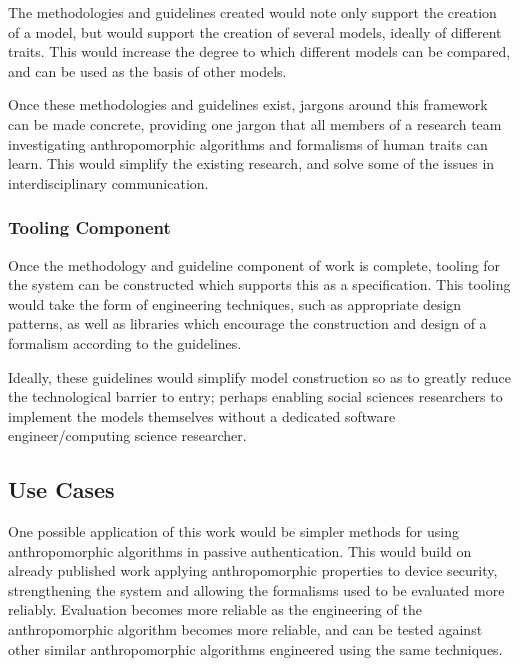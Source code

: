 The methodologies and guidelines created would note only support the creation of a model, but would support the creation of several models, ideally of different traits. This would increase the degree to which different models can be compared, and can be used as the basis of other models.\par

Once these methodologies and guidelines exist, jargons around this framework can be made concrete, providing one jargon that all members of a research team investigating anthropomorphic algorithms and formalisms of human traits can learn. This would simplify the existing research, and solve some of the issues in interdisciplinary communication.\par

\subsubsection*{Tooling Component}\label{sec:tooling}
Once the methodology and guideline component of work is complete, tooling for the system can be constructed which supports this as a specification. This tooling would take the form of engineering techniques, such as appropriate design patterns, as well as libraries which encourage the construction and design of a formalism according to the guidelines.\par

Ideally, these guidelines would simplify model construction so as to greatly reduce the technological barrier to entry; perhaps enabling social sciences researchers to implement the models themselves without a dedicated software engineer/computing science researcher.\par

\subsection{Use Cases}
One possible application of this work would be simpler methods for using anthropomorphic algorithms in passive authentication. This would build on already published work applying anthropomorphic properties to device security\cite{Crawford2013127}, strengthening the system and allowing the formalisms used to be evaluated more reliably. Evaluation becomes more reliable as the engineering of the anthropomorphic algorithm becomes more reliable, and can be tested against other similar anthropomorphic algorithms engineered using the same techniques.\par

